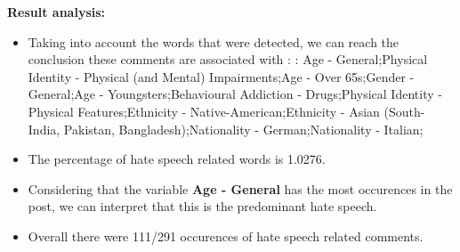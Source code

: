 \documentclass[11pt]{article}
\begin{document}
\textbf{\Large Result analysis:}

\begin{itemize}\item Taking into account the words that were detected, we can reach the conclusion these comments are associated with : : Age - General;Physical Identity - Physical (and Mental) Impairments;Age - Over 65s;Gender - General;Age - Youngsters;Behavioural Addiction - Drugs;Physical Identity - Physical Features;Ethnicity - Native-American;Ethnicity - Asian (South- India, Pakistan, Bangladesh);Nationality - German;Nationality - Italian;%

\item The percentage of hate speech related words is 1.0276.

\item Considering that the variable \textbf{Age - General} has the most occurences in the post, we can interpret that this is the predominant hate speech.

\item Overall there were 111/291 occurences of hate speech related comments.\end{itemize}
\end{document}

